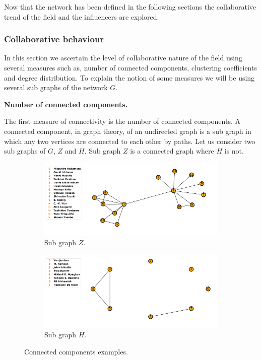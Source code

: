\documentclass{article}
\begin{document}
Now that the network has been defined in the following sections the collaborative
trend of the field and the influencers are explored.

\subsubsection{Collaborative behaviour}

In this section we ascertain the level of collaborative nature of the field
using several measures such as, number of connected components, clustering
coefficients and degree distribution. To explain the notion of some measures
we will be using several sub graphs of the network \(G\).

\textbf{Number of connected components.}

The first measure of connectivity is the number of connected components.
A connected component, in graph theory, of an undirected graph is a sub graph in
which any two vertices are connected to each other by paths. Let us consider
two sub graphs of \(G\), \(Z\) and \(H\). Sub graph \(Z\) is a connected graph
where \(H\) is not. 

\begin{center}
\begin{figure}[!hbtp]
    \begin{subfigure}{0.5\textwidth}
        \includegraphics[width=\textwidth]{./assets/images/connected_example_one.pdf}
        \caption{Sub graph \(Z\).}
    \end{subfigure}
    \begin{subfigure}{0.5\textwidth}
        \includegraphics[width=\textwidth]{./assets/images/connected_example_two.pdf}
        \caption{Sub graph \(H\).}
    \end{subfigure}
\caption{Connected components examples.}
\label{fig:connected_components}
\end{figure}
\end{center}
\end{document}
